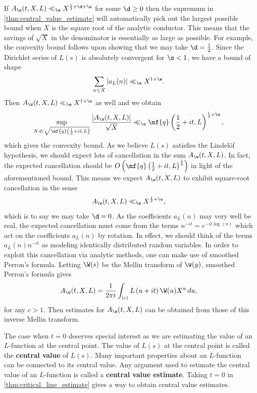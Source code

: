\documentclass[12pt]{article}
\begin{document}
      If \(A_{\w}(t,X,L) \ll_{\e} X^{\frac{1}{2}+\d+\e}\) for some \(\d \ge 0\) then the supremum in \cref{thm:central_value_estimate} will automatically pick out the largest possible bound when \(X\) is the square root of the analytic conductor. This means that the savings of \(\sqrt{X}\) in the denominator is essentially as large as possible. For example, the convexity bound follows upon showing that we may take \(\d = \frac{1}{2}\). Since the Dirichlet series of \(L(s)\) is absolutely convergent for \(\s < 1\), we have a bound of shape
      \[
        \sum_{n \le X}|a_{L}(n)| \ll_{\e} X^{1+\e}.
      \]
      Then \(A_{\w}(t,X,L) \ll_{\e} X^{1+\e}\) as well and we obtain
      \begin{equation}\label{equ:coefficient_sum_trivial_bound}
        \sup_{X \ll \sqrt{\mf{q}\left(\frac{1}{2}+it,L\right)}}\frac{|A_{\w}(t,X,L)|}{\sqrt{X}} \ll_{\e} \mf{q}\left(\frac{1}{2}+it,L\right)^{\frac{1}{4}+\e},
      \end{equation}
      which gives the convexity bound. As we believe \(L(s)\) satisfies the Lindel\"of hypothesis, we should expect lots of cancellation in the sum \(A_{\w}(t,X,L)\). In fact, the expected cancellation should be \(O\left(\mf{q}\left(\frac{1}{2}+it,L\right)^{\frac{1}{4}}\right)\) in light of the aforementioned bound. This means we expect \(A_{\w}(t,X,L)\) to exhibit square-root cancellation in the sense
      \[
        A_{\w}(t,X,L) \ll_{\e} X^{\frac{1}{2}+\e},
      \]
      which is to say we may take \(\d = 0\). As the coefficients \(a_{L}(n)\) may very well be real, the expected cancellation must come from the terms \(n^{-it} = e^{-it\log(n)}\) which act on the coefficients \(a_{L}(n)\) by rotation. In effect, we should think of the terms \(a_{L}(n)n^{-it}\) as modeling identically distributed random variables. In order to exploit this cancellation via analytic methods, one can make use of smoothed Perron's formula. Letting \(\W(s)\) be the Mellin transform of \(\w(y)\), smoothed Perron's formula gives
      \[
        A_{\w}(t,X,L) = \frac{1}{2\pi i}\int_{(c)}L\left(u+it\right)\W(u)X^{u}\,du,
      \]
      for any \(c > 1\). Then estimates for \(A_{\w}(t,X,L)\) can be obtained from those of this inverse Mellin transform.

      The case when \(t = 0\) deserves special interest as we are estimating the value of an \(L\)-function at the central point. The value of \(L(s)\) at the central point is called the \textbf{central value} of \(L(s)\). Many important properties about an \(L\)-function can be connected to its central value. Any argument used to estimate the central value of an \(L\)-function is called a \textbf{central value estimate}. Taking \(t = 0\) in \cref{thm:critical_line_estimate} gives a way to obtain central value estimates.
\end{document}
